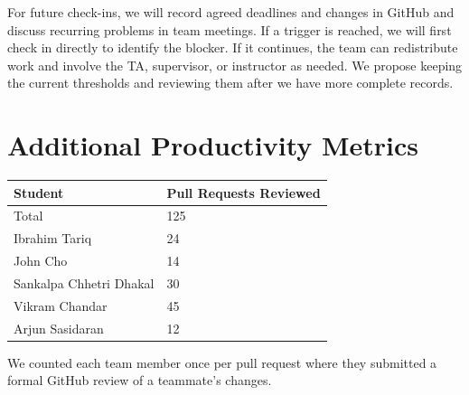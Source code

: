 \documentclass{article}
\begin{document}
For future check-ins, we will record agreed deadlines and changes in GitHub
and discuss recurring problems in team meetings. If a trigger is reached, we
will first check in directly to identify the blocker. If it continues, the
team can redistribute work and involve the TA, supervisor, or instructor as
needed. We propose keeping the current thresholds and reviewing them after
we have more complete records.

\section{Additional Productivity Metrics}

\begin{table}[H]
\centering
\begin{tabular}{ll}
\toprule
\textbf{Student} & \textbf{Pull Requests Reviewed}\\
\midrule
Total & 125\\
Ibrahim Tariq & 24\\
John Cho & 14\\
Sankalpa Chhetri Dhakal & 30\\
Vikram Chandar & 45\\
Arjun Sasidaran & 12\\
\bottomrule
\end{tabular}
\end{table}

We counted each team member once per pull request where they submitted a
formal GitHub review of a teammate's changes.
\end{document}
